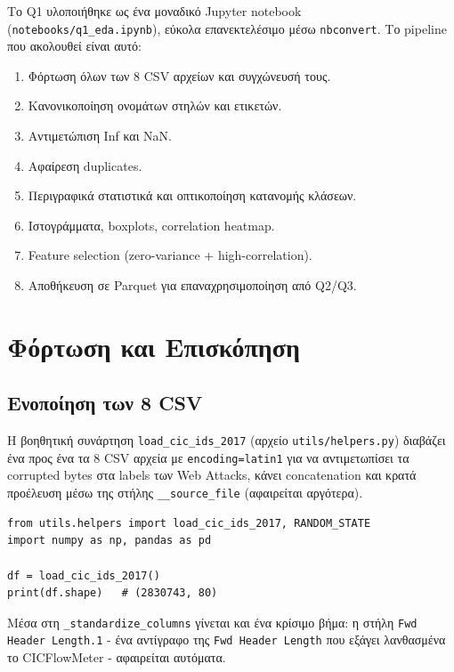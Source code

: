 \documentclass[12pt,a4paper,twoside]{book}
\begin{document}
Το Q1 υλοποιήθηκε ως ένα μοναδικό Jupyter notebook
(\texttt{notebooks/q1\_eda.ipynb}), εύκολα επανεκτελέσιμο μέσω
\texttt{nbconvert}. Το pipeline που ακολουθεί είναι αυτό:

\begin{enumerate}
    \item Φόρτωση όλων των 8 CSV αρχείων και συγχώνευσή τους.
    \item Κανονικοποίηση ονομάτων στηλών και ετικετών.
    \item Αντιμετώπιση Inf και NaN.
    \item Αφαίρεση duplicates.
    \item Περιγραφικά στατιστικά και οπτικοποίηση κατανομής κλάσεων.
    \item Ιστογράμματα, boxplots, correlation heatmap.
    \item Feature selection (zero-variance + high-correlation).
    \item Αποθήκευση σε Parquet για επαναχρησιμοποίηση από Q2/Q3.
\end{enumerate}

\section{Φόρτωση και Επισκόπηση}

\subsection{Ενοποίηση των 8 CSV}

Η βοηθητική συνάρτηση \texttt{load\_cic\_ids\_2017} (αρχείο
\texttt{utils/helpers.py}) διαβάζει ένα προς ένα τα 8 CSV αρχεία με
\texttt{encoding=\textquotesingle latin1\textquotesingle} για να
αντιμετωπίσει τα corrupted bytes στα labels των Web Attacks, κάνει
concatenation και κρατά προέλευση μέσω της στήλης \texttt{\_\_source\_file}
(αφαιρείται αργότερα).

\begin{tcolorbox}[myCustomStyle={Φόρτωση Dataset}]
\begin{lstlisting}[style=myPythonStyle]
from utils.helpers import load_cic_ids_2017, RANDOM_STATE
import numpy as np, pandas as pd

df = load_cic_ids_2017()
print(df.shape)   # (2830743, 80)
\end{lstlisting}
\end{tcolorbox}

Μέσα στη \texttt{\_standardize\_columns} γίνεται και ένα κρίσιμο βήμα: η
στήλη \texttt{Fwd Header Length.1} - ένα αντίγραφο της
\texttt{Fwd Header Length} που εξάγει λανθασμένα το CICFlowMeter -
αφαιρείται αυτόματα.
\end{document}
